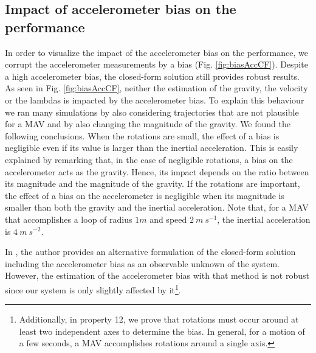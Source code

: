 \documentclass[letterpaper, 10 pt, conference]{ieeeconf}  %
\begin{document}
\subsection{Impact of accelerometer bias on the performance \label{sec:biasAcc}}
In order to visualize the impact of the accelerometer bias on the performance,
we corrupt the accelerometer measurements by a bias (Fig. \ref{fig:biasAccCF}).
Despite a high accelerometer bias, the closed-form solution still provides robust results.
As seen in Fig. \ref{fig:biasAccCF}, neither the estimation of the gravity, the velocity or the lambdas is impacted by the accelerometer bias.
To explain this behaviour we ran many simulations by also considering trajectories that are not plausible for a MAV and by also changing the magnitude of the gravity. We found the following conclusions. When the rotations are small, the effect of a bias is negligible even if its value is larger than the inertial acceleration. This is easily explained by remarking that, in the case of negligible rotations, a bias on the accelerometer acts as the gravity. Hence, its impact depends on the ratio between its magnitude and the magnitude of the gravity.
If the rotations are important, the effect of a bias on the accelerometer is negligible when its magnitude is smaller than both the gravity and the inertial acceleration. Note that, for a MAV that accomplishes a loop of radius $1m$ and speed $2~m~s^{-1}$, the inertial acceleration is $4~m~s^{-2}$.

In \cite{Martinelli2014}, the author provides an alternative formulation of the closed-form solution including the accelerometer bias as an observable unknown of the system.
However, the estimation of the accelerometer bias with that method is not robust since our system is only slightly affected by it\footnote{Additionally, in \cite{Martinelli2014} property 12, we prove that rotations must occur around at least two independent axes to determine the bias. In general, for a motion of a few seconds, a MAV accomplishes rotations around a single axis.}.
\end{document}
